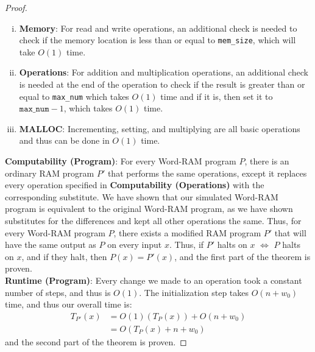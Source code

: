 \documentclass[11pt]{scrartcl}
\theoremstyle{dotlessP}
\theoremstyle{dotlessN}
\begin{document}
\begin{proof}
\begin{enumerate}[(i)]
				\item \textbf{Memory}: For read and write operations, an additional check is needed to check if the memory location is less than or equal to \texttt{mem\_size}, which will take  $O(1)$ time.
				\item \textbf{Operations}: For addition and multiplication operations, an additional check is needed at the end of the operation to check if the result is greater than or equal to \texttt{max\_num} which takes $O(1)$ time and if it is, then set it to $\texttt{max\_num} - 1$, which takes $O(1)$ time.
				\item \textbf{MALLOC}: Incrementing, setting, and multiplying are all basic operations and thus can be done in $O(1)$ time.
\end{enumerate}
\item \textbf{Computability (Program)}: For every Word-RAM program $P$, there is an ordinary RAM program $P'$ that performs the same operations, except it replaces every operation specified in \textbf{Computability (Operations)} with the corresponding substitute. We have shown that our simulated Word-RAM program is equivalent to the original Word-RAM program, as we have shown substitutes for the differences and kept all other operations the same. Thus, for every Word-RAM program $P$, there exists a modified RAM program $P'$ that will have the same output as $P$ on every input $x$. Thus, if $P'$ halts on $x$ $\iff$  $P$ halts on $x$, and if they halt, then $P(x) = P'(x)$, and the first part of the theorem is proven.
	\\

	\textbf{Runtime (Program)}: Every change we made to an operation took a constant number of steps, and thus is  $O(1)$. The initialization step takes $O(n + w_0)$ time, and thus our overall time is:
	\begin{align*}
		T_{P'}(x) &= O(1)(T_P(x)) + O(n + w_0) \\
				  &= O(T_P(x) + n + w_0)
	\end{align*}
		and the second part of the theorem is proven.
		\end{proof}
\end{document}
